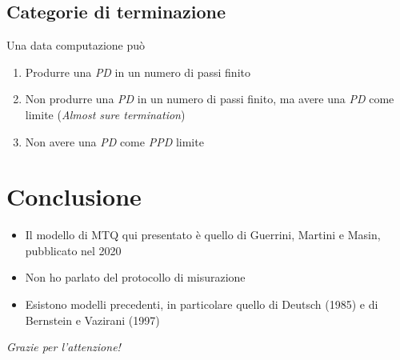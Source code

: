 \documentclass{beamer}
\begin{document}
\subsection{Categorie di terminazione}

\begin{frame}{\subsecname}{}
	Una data computazione può
	\begin{enumerate}
		\item<+-> Produrre una \textit{PD} in un numero di passi finito
		\item<+-> Non produrre una \textit{PD} in un numero di passi finito, ma avere una \textit{PD} come limite (\foreignlanguage{english}{\textit{Almost sure termination}})
		\item<+-> Non avere una \textit{PD} come \textit{PPD} limite
	\end{enumerate}
\end{frame}

\section{Conclusione}

\begin{frame}{\secname}{}
	\begin{itemize}
		\item<+-> Il modello di MTQ qui presentato è quello di Guerrini, Martini e Masin, pubblicato nel 2020
		\item<+-> Non ho parlato del protocollo di misurazione
		\item<+-> Esistono modelli precedenti, in particolare quello di Deutsch (1985) e di Bernstein e Vazirani (1997)
	\end{itemize}
\end{frame}

\begin{frame}{}
	\centering \huge
	\emph{Grazie per l'attenzione!}
\end{frame}
\end{document}
